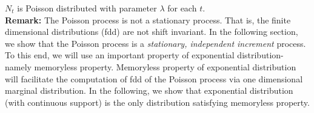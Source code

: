 \documentclass[11 pt]{article}
\theoremstyle{plain}
\theoremstyle{definition}
\theoremstyle{remark}
\begin{document}
$N_t$ is Poisson distributed with parameter $\lambda$ for each $t$.  \\
\textbf{Remark:} The Poisson process is not a stationary process. That is, the finite dimensional distributions (fdd) are not shift invariant. In the following section, we show that the Poisson process is a \textit{stationary,  independent increment} process. To this end, we will use an important property of exponential distribution- namely memoryless property. Memoryless property of exponential distribution will facilitate the computation of fdd of the Poisson process via one dimensional marginal distribution. In the following, we show that exponential distribution (with  continuous support) is the only distribution satisfying memoryless property.
%
%
%
%
\end{document}

